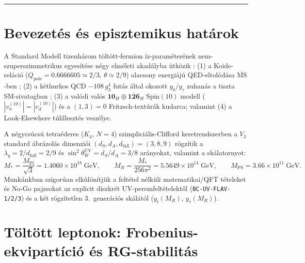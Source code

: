 \documentclass[11pt,a4paper]{article}
\begin{document}
\begin{abstract}
\end{abstract}

\tableofcontents
\vspace{0.4em}
\hrule
\vspace{0.8em}

\section{Bevezetés és episztemikus határok}

A Standard Modell tizenhárom töltött-fermion íz-paraméterének nem-szuperszimmetrikus egyesítése négy elméleti akadályba ütközik \cite{PDG2024,Cabibbo1963,KobayashiMaskawa1973,PatiSalam1974,FritzschMinkowski1975,GeorgiJarlskog1979,MaRajasekaran2001,AltarelliFeruglio2010}: (1) a Koide-reláció ($Q_{\mathrm{pole}} = 0.6666605 \simeq 2/3$, $\theta \simeq 2/9$) \cite{Koide1983,Brannen2006} alacsony energiájú QED-eltolódása $\overline{\mathrm{MS}}$-ben \cite{Sumino2009,XingZhangZhou2012}; (2) a kéthurkos QCD $-108\,g_3^4$ futás által okozott $y_b/y_\tau$ zuhanás a tiszta SM-sivatagban \cite{Arason1992,HuangZhou2021,AntuschSpinrath2009,AntuschMaurer2013}; (3) a valódi valós $\mathbf{10}_H \oplus \overline{\mathbf{126}}_H$ $\mathrm{Spin}(10)$ modell ($|v_u^{(10)}|=|v_d^{(10)}|$) \cite{BabuMohapatra1993,BajcSenjanovicVissani2006,DueckRodejohann2013} és a $(1,3)=0$ Fritzsch-textúrák \cite{Fritzsch1978,RobertsRomaninoRoss2001} kudarca; valamint (4) a Look-Elsewhere túlillesztés veszélye.

A négycsúcsú tetraéderes ($K_4$, $N = 4$) szimpliciális-Clifford keretrendszerben \cite{Olcsak2026Zenodo,Olcsak2026Paper24} a $V_3$ standard ábrázolás dimenziói $(d_S, d_A, d_{\mathrm{full}}) = (3, 8, 9)$ rögzítik a $\lambda_q = 2/d_{\mathrm{full}} = 2/9$ és $\sin^2\theta_W^{\mathrm{UV}} = d_S/d_A = 3/8$ arányokat, valamint a skálatornyot:
\begin{equation}
M_* = \frac{M_{\mathrm{Pl}}}{\sqrt{3}} = 1.4060\times 10^{18}\;\mathrm{GeV}, \qquad
M_R = \frac{M_*}{256\pi^2} = 5.5649\times 10^{14}\;\mathrm{GeV}, \qquad
M_{\mathrm{PS}} = 3.66\times 10^{11}\;\mathrm{GeV}.
\end{equation}
Munkánkban szigorúan elkülönítjük a feltétel nélküli matematikai/QFT tételeket és No-Go pajzsokat az explicit diszkrét UV-peremfeltételektől (\texttt{BC-UV-FLAV-1/2/3}) és a két rögzítetlen 3.\ generációs skálától ($y_t(M_R)$, $y_\tau(M_R)$).

\section{Töltött leptonok: Frobenius-ekvipartíció és RG-stabilitás}
\end{document}
